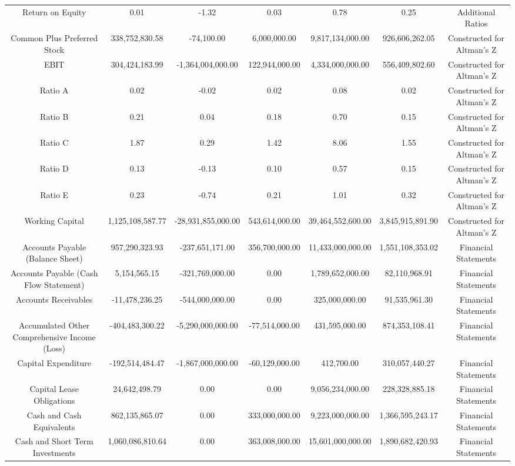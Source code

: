 \begin{longtable}{ccccccc}
Return on Equity & 0.01 & -1.32 & 0.03 & 0.78 & 0.25 & Additional Ratios \\
Common Plus Preferred Stock & 338,752,830.58 & -74,100.00 & 6,000,000.00 & 9,817,134,000.00 & 926,606,262.05 & Constructed for Altman's Z \\
EBIT & 304,424,183.99 & -1,364,004,000.00 & 122,944,000.00 & 4,334,000,000.00 & 556,409,802.60 & Constructed for Altman's Z \\
Ratio A & 0.02 & -0.02 & 0.02 & 0.08 & 0.02 & Constructed for Altman's Z \\
Ratio B & 0.21 & 0.04 & 0.18 & 0.70 & 0.15 & Constructed for Altman's Z \\
Ratio C & 1.87 & 0.29 & 1.42 & 8.06 & 1.55 & Constructed for Altman's Z \\
Ratio D & 0.13 & -0.13 & 0.10 & 0.57 & 0.15 & Constructed for Altman's Z \\
Ratio E & 0.23 & -0.74 & 0.21 & 1.01 & 0.32 & Constructed for Altman's Z \\
Working Capital & 1,125,108,587.77 & -28,931,855,000.00 & 543,614,000.00 & 39,464,552,600.00 & 3,845,915,891.90 & Constructed for Altman's Z \\
Accounts Payable (Balance Sheet) & 957,290,323.93 & -237,651,171.00 & 356,700,000.00 & 11,433,000,000.00 & 1,551,108,353.02 & Financial Statements \\
Accounts Payable (Cash Flow Statement) & 5,154,565.15 & -321,769,000.00 & 0.00 & 1,789,652,000.00 & 82,110,968.91 & Financial Statements \\
Accounts Receivables & -11,478,236.25 & -544,000,000.00 & 0.00 & 325,000,000.00 & 91,535,961.30 & Financial Statements \\
Accumulated Other Comprehensive Income (Loss) & -404,483,300.22 & -5,290,000,000.00 & -77,514,000.00 & 431,595,000.00 & 874,353,108.41 & Financial Statements \\
Capital Expenditure & -192,514,484.47 & -1,867,000,000.00 & -60,129,000.00 & 412,700.00 & 310,057,440.27 & Financial Statements \\
Capital Lease Obligations & 24,642,498.79 & 0.00 & 0.00 & 9,056,234,000.00 & 228,328,885.18 & Financial Statements \\
Cash and Cash Equivalents & 862,135,865.07 & 0.00 & 333,000,000.00 & 9,223,000,000.00 & 1,366,595,243.17 & Financial Statements \\
Cash and Short Term Investments & 1,060,086,810.64 & 0.00 & 363,008,000.00 & 15,601,000,000.00 & 1,890,682,420.93 & Financial Statements \\

\end{longtable}
